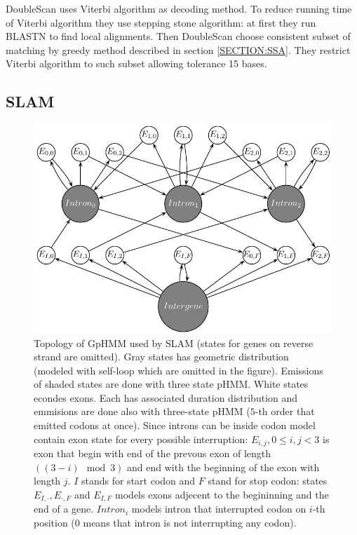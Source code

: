 DoubleScan uses Viterbi algorithm as decoding method.  To reduce running time of
Viterbi algorithm they use stepping stone algorithm: at first they run BLASTN to
find local alignments. Then DoubleScan choose consistent subset of matching by
greedy method described in section \ref{SECTION:SSA}. They restrict Viterbi
algorithm to such subset allowing tolerance 15 bases.

\subsection{SLAM} 

\begin{figure}
\begin{center}
\includegraphics{../figures/slam.pdf}
\end{center}
\caption[HMM topology of SLAM's GpHMM]{
Topology of GpHMM used by SLAM (states for genes on reverse strand are omitted).
Gray states has geometric distribution (modeled with self-loop which are omitted
in the figure). Emissions of shaded states are done with three state pHMM. White
states econdes exons. Each has associated duration distribution and emmisions
are done also with three-state pHMM ($5$-th order that emitted codons at once).
Since introns can be inside codon model contain exon state for every possible
interruption: $E_{i,j},0\leq i,j<3$ is exon that begin with end of the prevous
exon of length $((3-i)\mod 3)$ and end with the beginning of the exon with
length $j$. $I$ stands for start codon and $F$ stand for stop codon: states
$E_{I,\cdot},E_{\cdot,F}$ and $E_{I,F}$ models exons adjecent to the begininning
and the end of a gene.  $Intron_i$ models intron that interrupted codon on
$i$-th position ($0$ means that intron is not interrupting any codon).
}\label{FIGURE:SLAM} \end{figure}

